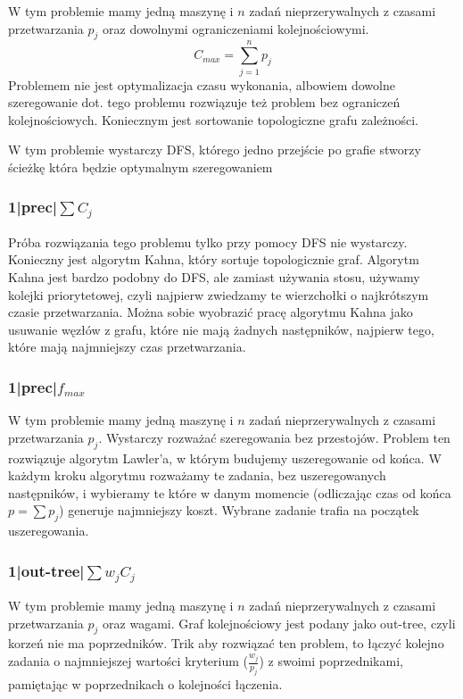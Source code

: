 \documentclass{../notatki}
\begin{document}
W tym problemie mamy jedną maszynę i $n$ zadań nieprzerywalnych z
czasami przetwarzania $p_j$ oraz dowolnymi ograniczeniami kolejnościowymi.
$$
C_{max} = \sum_{j=1}^n p_j
$$
Problemem nie jest optymalizacja czasu wykonania, albowiem dowolne szeregowanie
dot. tego problemu rozwiązuje też problem bez ograniczeń kolejnościowych.
Koniecznym jest sortowanie topologiczne grafu zależności.

W tym problemie wystarczy DFS, którego jedno przejście po grafie stworzy ścieżkę
która będzie optymalnym szeregowaniem

\subsubsection{1|prec|\texorpdfstring{$\sum C_j$}{sum Cj}}

Próba rozwiązania tego problemu tylko przy pomocy DFS nie wystarczy.
Konieczny jest algorytm Kahna, który sortuje topologicznie graf.
Algorytm Kahna jest bardzo podobny do DFS, ale zamiast używania stosu,
używamy kolejki priorytetowej, czyli najpierw zwiedzamy te wierzchołki o
najkrótszym czasie przetwarzania. Można sobie wyobrazić pracę algorytmu Kahna
jako usuwanie węzłów z grafu, które nie mają żadnych następników, najpierw
tego, które mają najmniejszy czas przetwarzania.

\subsubsection{1|prec|\texorpdfstring{$f_{max}$}{fmax}}

W tym problemie mamy jedną maszynę i $n$ zadań nieprzerywalnych z
czasami przetwarzania $p_j$.
Wystarczy rozważać szeregowania bez przestojów. Problem ten rozwiązuje
algorytm Lawler'a, w którym budujemy uszeregowanie od końca. W każdym kroku
algorytmu rozważamy te zadania, bez uszeregowanych następników, i wybieramy
te które w danym momencie (odliczając czas od końca $p = \sum p_j$)
generuje najmniejszy koszt. Wybrane zadanie trafia na początek uszeregowania.

\subsubsection{1|out-tree|\texorpdfstring{$\sum w_jC_j$}{sum wjCj}}

W tym problemie mamy jedną maszynę i $n$ zadań nieprzerywalnych z
czasami przetwarzania $p_j$ oraz wagami. Graf kolejnościowy jest podany
jako out-tree, czyli korzeń nie ma poprzedników.
Trik aby rozwiązać ten problem, to łączyć kolejno zadania o
najmniejszej wartości
kryterium ($\frac{w_j}{p_j}$) z swoimi poprzednikami, pamiętając w poprzednikach
o kolejności łączenia.
\end{document}
